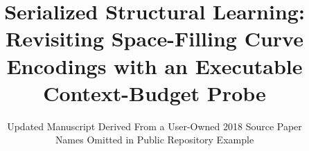 \documentclass[11pt]{article}
\title{Serialized Structural Learning:\\Revisiting Space-Filling Curve Encodings with an Executable Context-Budget Probe}
\author{Updated Manuscript Derived From a User-Owned 2018 Source Paper\\Names Omitted in Public Repository Example}
\date{}
\begin{document}
\maketitle

\begin{abstract}

\end{abstract}










\appendix




\end{document}
